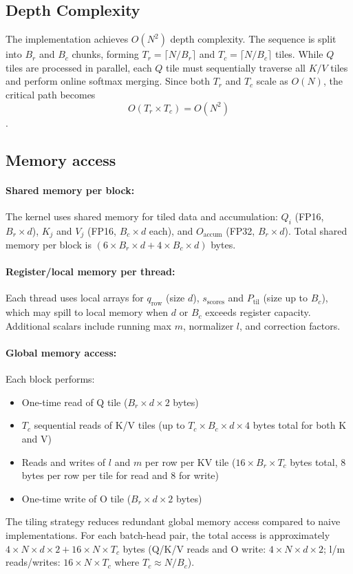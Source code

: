 \documentclass[11pt]{article}
\begin{document}
\subsection{Depth Complexity}
The implementation achieves $O(N^2)$ depth complexity. The sequence is split into $B_r$ and $B_c$ chunks, forming $T_r = \lceil N/B_r \rceil$ and $T_c = \lceil N/B_c \rceil$ tiles. While $Q$ tiles are processed in parallel, each $Q$ tile must sequentially traverse all $K/V$ tiles and perform online softmax merging. Since both $T_r$ and $T_c$ scale as $O(N)$, the critical path becomes \[O(T_r \times T_c) = O(N^2)\].
\subsection{Memory access}
\paragraph{Shared memory per block:} The kernel uses shared memory for tiled data and accumulation: $Q_i$ (FP16, $B_r \times d$), $K_j$ and $V_j$ (FP16, $B_c \times d$ each), and $O_{\text{accum}}$ (FP32, $B_r \times d$). Total shared memory per block is $(6 \times B_r \times d + 4 \times B_c \times d)$ bytes.

\paragraph{Register/local memory per thread:} Each thread uses local arrays for $q_{\text{row}}$ (size $d$), $s_{\text{scores}}$ and $P_{\text{til}}$ (size up to $B_c$), which may spill to local memory when $d$ or $B_c$ exceeds register capacity. Additional scalars include running max $m$, normalizer $l$, and correction factors.

\paragraph{Global memory access:} Each block performs:
\begin{itemize}
    \item One-time read of Q tile ($B_r \times d \times 2$ bytes)
    \item $T_c$ sequential reads of K/V tiles (up to $T_c \times B_c \times d \times 4$ bytes total for both K and V)
    \item Reads and writes of $l$ and $m$ per row per KV tile ($16 \times B_r \times T_c$ bytes total, 8 bytes per row per tile for read and 8 for write)
    \item One-time write of O tile ($B_r \times d \times 2$ bytes)
\end{itemize}
The tiling strategy reduces redundant global memory access compared to naive implementations. For each batch-head pair, the total access is approximately $4 \times N \times d \times 2 + 16 \times N \times T_c$ bytes (Q/K/V reads and O write: $4 \times N \times d \times 2$; l/m reads/writes: $16 \times N \times T_c$ where $T_c \approx N/B_c$).
\end{document}
